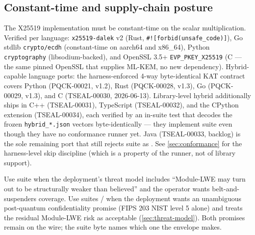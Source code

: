 \subsection{Constant-time and supply-chain posture}

The X25519 implementation must be constant-time on the scalar multiplication. Verified per language: \texttt{x25519-dalek} v2 (Rust, \texttt{\#![forbid(unsafe\_code)]}), Go stdlib \texttt{crypto/ecdh} (constant-time on aarch64 and x86\_64), Python \texttt{cryptography} (libsodium-backed), and OpenSSL 3.5+ \texttt{EVP\_PKEY\_X25519} (C --- the same pinned OpenSSL that supplies ML-KEM, no new dependency). Hybrid-capable language ports: the harness-enforced 4-way byte-identical KAT contract covers Python (PQCK-00021, v1.2), Rust (PQCK-00028, v1.3), Go (PQCK-00029, v1.3), and C (TSEAL-00030, 2026-06-13). Library-level hybrid additionally ships in C++ (TSEAL-00031), TypeScript (TSEAL-00032), and the CPython extension (TSEAL-00034), each verified by an in-suite test that decodes the frozen \texttt{hybrid\_*.json} vectors byte-identically --- they implement suite  even though they have no \pqcrypt{} conformance runner yet. Java (TSEAL-00033, backlog) is the sole remaining port that still rejects suite  as . See \cref{sec:conformance} for the harness-level skip discipline (which is a property of the runner, not of library support).

\begin{calloutinfo}
Use suite  when the deployment's threat model includes ``Module-LWE may turn out to be structurally weaker than believed'' and the operator wants belt-and-suspenders coverage. Use suites / when the deployment wants an unambiguous post-quantum confidentiality promise (FIPS 203 NIST level 5 alone) and treats the residual Module-LWE risk as acceptable (\cref{sec:threat-model}). Both promises remain on the wire; the suite byte names which one the envelope makes.
\end{calloutinfo}
